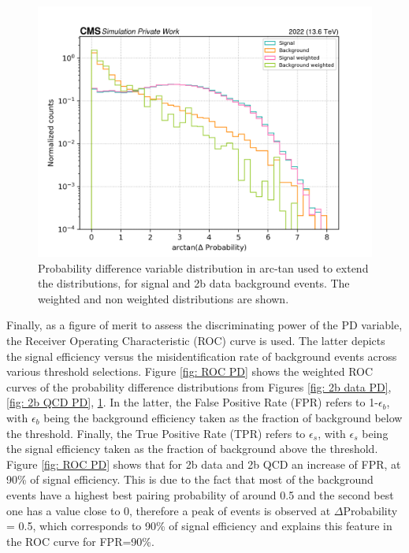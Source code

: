 \begin{figure}[hbt]
    \centering
    \includegraphics[width=0.7\linewidth]{Images/7.S:B/Prob diff/4b QCD arctan.png}
    \caption{Probability difference variable distribution in arc-tan used to extend the distributions, for signal and 2b data background events. The weighted and non weighted distributions are shown.}
    \label{fig: 4b QCD PD}
\end{figure}


Finally, as a figure of merit to assess the discriminating power of the PD variable, the Receiver Operating Characteristic (ROC) curve is used. The latter depicts the signal efficiency versus the misidentification rate of background events across various threshold selections. Figure \ref{fig: ROC PD} shows the weighted ROC curves of the probability difference distributions from Figures \ref{fig: 2b data PD}, \ref{fig: 2b QCD PD}, \ref{fig: 4b QCD PD}. In the latter, the False Positive Rate (FPR) refers to 1-$\epsilon_b$, with $\epsilon_b$ being the background efficiency taken as the fraction of background below the threshold. Finally, the True Positive Rate (TPR) refers to $\epsilon_s$, with $\epsilon_s$ being the signal efficiency taken as the fraction of background above the threshold. Figure \ref{fig: ROC PD} shows that for 2b data and 2b QCD an increase of FPR, at 90\% of signal efficiency. This is due to the fact that most of the background events have a highest best pairing probability of around 0.5 and the second best one has a value close to 0, therefore a peak of events is observed at $\Delta$Probability = 0.5, which corresponds to 90\% of signal efficiency and explains this feature in the ROC curve for FPR=90\%.


